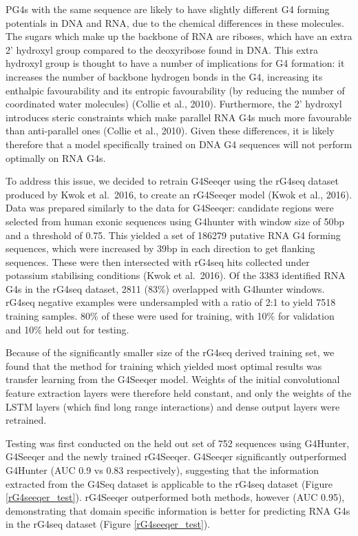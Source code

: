 \documentclass[12pt,a4paper,]{report}
\begin{document}
PG4s with the same sequence are likely to have slightly different G4
forming potentials in DNA and RNA, due to the chemical differences in
these molecules. The sugars which make up the backbone of RNA are
riboses, which have an extra 2' hydroxyl group compared to the
deoxyribose found in DNA. This extra hydroxyl group is thought to have a
number of implications for G4 formation: it increases the number of
backbone hydrogen bonds in the G4, increasing its enthalpic
favourability and its entropic favourability (by reducing the number of
coordinated water molecules) (Collie et al., 2010). Furthermore, the 2'
hydroxyl introduces steric constraints which make parallel RNA G4s much
more favourable than anti-parallel ones (Collie et al., 2010). Given
these differences, it is likely therefore that a model specifically
trained on DNA G4 sequences will not perform optimally on RNA G4s.

To address this issue, we decided to retrain G4Seeqer using the rG4seq
dataset produced by Kwok et al.~2016, to create an rG4Seeqer model (Kwok
et al., 2016). Data was prepared similarly to the data for G4Seeqer:
candidate regions were selected from human exonic sequences using
G4hunter with window size of 50bp and a threshold of 0.75. This yielded
a set of 186279 putative RNA G4 forming sequences, which were increased
by 39bp in each direction to get flanking sequences. These were then
intersected with rG4seq hits collected under potassium stabilising
conditions (Kwok et al.~2016). Of the 3383 identified RNA G4s in the
rG4seq dataset, 2811 (83\%) overlapped with G4hunter windows. rG4seq
negative examples were undersampled with a ratio of 2:1 to yield 7518
training samples. 80\% of these were used for training, with 10\% for
validation and 10\% held out for testing.

Because of the significantly smaller size of the rG4seq derived training
set, we found that the method for training which yielded most optimal
results was transfer learning from the G4Seeqer model. Weights of the
initial convolutional feature extraction layers were therefore held
constant, and only the weights of the LSTM layers (which find long range
interactions) and dense output layers were retrained.

Testing was first conducted on the held out set of 752 sequences using
G4Hunter, G4Seeqer and the newly trained rG4Seeqer. G4Seeqer
significantly outperformed G4Hunter (AUC 0.9 vs 0.83 respectively),
suggesting that the information extracted from the G4Seq dataset is
applicable to the rG4seq dataset (Figure \ref{rG4seeqer_test}).
rG4Seeqer outperformed both methods, however (AUC 0.95), demonstrating
that domain specific information is better for predicting RNA G4s in the
rG4seq dataset (Figure \ref{rG4seeqer_test}).
\end{document}

